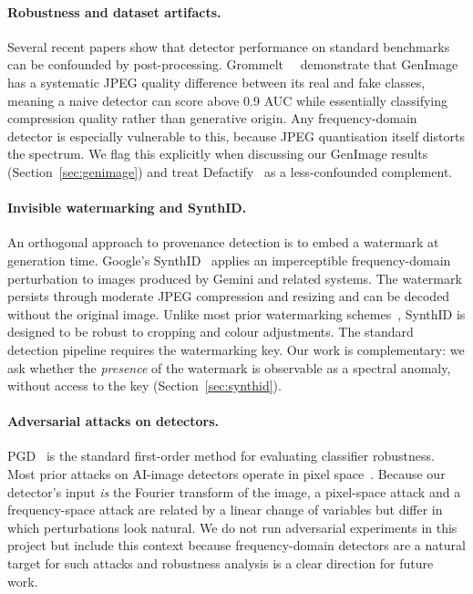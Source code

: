 \paragraph{Robustness and dataset artifacts.}
Several recent papers show that detector performance on standard benchmarks can be confounded by post-processing. Grommelt~\etal~\cite{grommelt2024} demonstrate that GenImage~\cite{genimage} has a systematic JPEG quality difference between its real and fake classes, meaning a naive detector can score above 0.9 AUC while essentially classifying compression quality rather than generative origin. Any frequency-domain detector is especially vulnerable to this, because JPEG quantisation itself distorts the spectrum. We flag this explicitly when discussing our GenImage results (Section~\ref{sec:genimage}) and treat Defactify~\cite{defactify} as a less-confounded complement.

\paragraph{Invisible watermarking and SynthID.}
An orthogonal approach to provenance detection is to embed a watermark at generation time. Google's SynthID~\cite{synthid2023} applies an imperceptible frequency-domain perturbation to images produced by Gemini and related systems. The watermark persists through moderate JPEG compression and resizing and can be decoded without the original image. Unlike most prior watermarking schemes~\cite{cox2007watermarking}, SynthID is designed to be robust to cropping and colour adjustments. The standard detection pipeline requires the watermarking key. Our work is complementary: we ask whether the \emph{presence} of the watermark is observable as a spectral anomaly, without access to the key (Section~\ref{sec:synthid}).

\paragraph{Adversarial attacks on detectors.}
PGD~\cite{madry2018pgd} is the standard first-order method for evaluating classifier robustness. Most prior attacks on AI-image detectors operate in pixel space~\cite{carlini2020evading}. Because our detector's input \emph{is} the Fourier transform of the image, a pixel-space attack and a frequency-space attack are related by a linear change of variables but differ in which perturbations look natural. We do not run adversarial experiments in this project but include this context because frequency-domain detectors are a natural target for such attacks and robustness analysis is a clear direction for future work.

